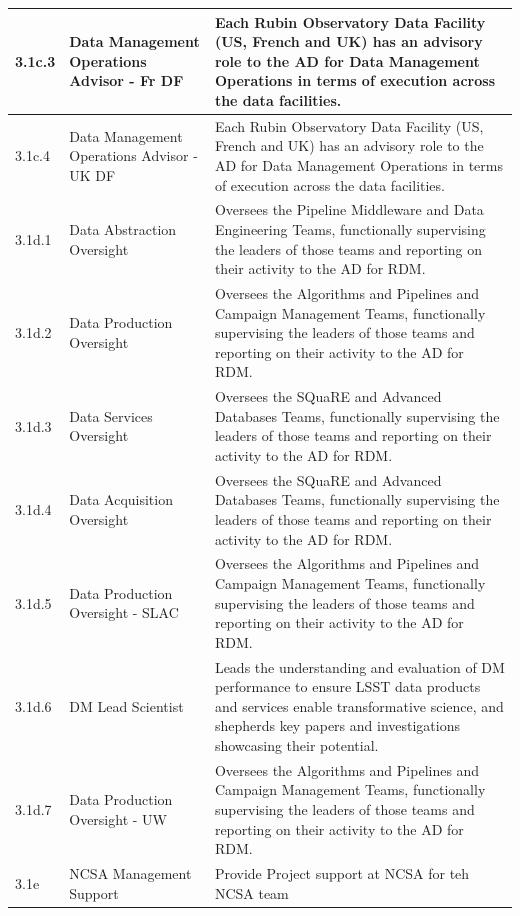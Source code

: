 \begin{longtable} {|p{}|p{}|p{}|}
{3.1c.3}&{Data Management Operations Advisor - Fr DF}&{Each Rubin Observatory Data Facility (US, French and UK) has an advisory role to the AD for Data Management Operations in terms of execution across the data facilities.  } \\ \hline
{3.1c.4}&{Data Management Operations Advisor - UK DF}&{Each Rubin Observatory Data Facility (US, French and UK) has an advisory role to the AD for Data Management Operations in terms of execution across the data facilities.  } \\ \hline
{3.1d.1}&{Data Abstraction Oversight}&{Oversees the Pipeline Middleware and Data Engineering Teams, functionally supervising the leaders of those teams and reporting on their activity to the AD for RDM. } \\ \hline
{3.1d.2}&{Data Production Oversight}&{Oversees the Algorithms and Pipelines and Campaign Management Teams, functionally supervising the leaders of those teams and reporting on their activity to the AD for RDM. } \\ \hline
{3.1d.3}&{Data Services Oversight}&{Oversees the SQuaRE and Advanced Databases Teams, functionally supervising the leaders of those teams and reporting on their activity to the AD for RDM. } \\ \hline
{3.1d.4}&{Data Acquisition Oversight}&{Oversees the SQuaRE and Advanced Databases Teams, functionally supervising the leaders of those teams and reporting on their activity to the AD for RDM. } \\ \hline
{3.1d.5}&{Data Production Oversight - SLAC}&{Oversees the Algorithms and Pipelines and Campaign Management Teams, functionally supervising the leaders of those teams and reporting on their activity to the AD for RDM. } \\ \hline
{3.1d.6}&{DM Lead Scientist}&{Leads the understanding and evaluation of DM performance to ensure LSST data products and services enable transformative science, and shepherds key papers and investigations showcasing their potential.} \\ \hline
{3.1d.7}&{Data Production Oversight - UW}&{Oversees the Algorithms and Pipelines and Campaign Management Teams, functionally supervising the leaders of those teams and reporting on their activity to the AD for RDM. } \\ \hline
{3.1e}&{NCSA Management Support}&{Provide Project support at NCSA for teh NCSA team} \\ \hline
\end{longtable} \normalsize
